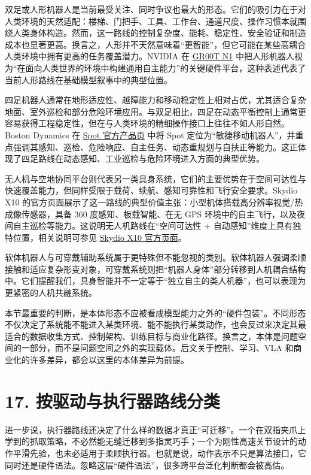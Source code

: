 双足或人形机器人是当前最受关注、同时争议也最大的形态。它们的吸引力在于对人类环境的天然适配：楼梯、门把手、工具、工作台、通道尺度、操作习惯本就围绕人类身体构造。然而，这一路线的控制复杂度、能耗、稳定性、安全验证和制造成本也显著更高。换言之，人形并不天然意味着“更智能”，但它可能在某些高耦合人类环境中拥有更高的任务覆盖潜力。NVIDIA 在 \href{https://arxiv.org/abs/2503.14734}{GR00T N1} 中把人形机器人视为“在面向人类世界的环境中构建通用自主能力”的关键硬件平台，这种表述代表了当前人形路线在基础模型叙事中的典型位置。

四足机器人通常在地形适应性、越障能力和移动稳定性上相对占优，尤其适合复杂地面、室外巡检和部分危险环境应用。与双足相比，四足在动态平衡控制上通常更容易获得工程稳定性，但在与人类环境的精细操作接口上往往不如人形自然。Boston Dynamics 在 \href{https://bostondynamics.com/products/spot/}{Spot 官方产品页} 中将 Spot 定位为“敏捷移动机器人”，并重点强调其感知、巡检、危险响应、自主任务、动态重规划与自扶正等能力。这正体现了四足路线在动态感知、工业巡检与危险环境进入方面的典型优势。

无人机与空地协同平台则代表另一类具身系统，它们的主要优势在于空间可达性与快速覆盖能力，但同样受限于载荷、续航、感知可靠性和飞行安全要求。Skydio X10 的官方页面展示了这一路线的典型价值主张：小型机体搭载高分辨率视觉/热成像传感器，具备 360 度感知、板载智能、在无 GPS 环境中的自主飞行，以及夜间自主巡检等能力。这说明无人机路线在“空间可达性 + 自动感知”维度上具有独特位置，相关说明可参见 \href{https://www.skydio.com/x10/}{Skydio X10 官方页面}。

软体机器人与可穿戴辅助系统属于更特殊但不能忽视的类别。软体机器人强调柔顺接触和适应复杂形变对象，可穿戴系统则把“机器人身体”部分转移到人机耦合结构中。它们提醒我们，具身智能并不一定等于“独立自主的类人机器”，也可以表现为更紧密的人机共融系统。

本节最重要的判断，是本体形态不应被看成模型能力之外的“硬件包装”。不同形态不仅决定了系统能不能进入某类环境、能不能执行某类动作，也会反过来决定其最适合的数据收集方式、控制架构、训练目标与商业化路径。换言之，本体是问题空间的一部分，而不是问题空间之外的实现载体。后文关于控制、学习、VLA 和商业化的许多差异，都会以这里的本体差异为前提。

\section*{17. 按驱动与执行器路线分类}

进一步说，执行器路线还决定了什么样的数据才真正“可迁移”。一个在双指夹爪上学到的抓取策略，不必然能无缝迁移到多指灵巧手；一个为刚性高速关节设计的动作平滑先验，也未必适用于柔顺执行器。也就是说，动作表示不只是算法接口，它同时还是硬件语法。忽略这层“硬件语法”，很多跨平台泛化判断都会被高估。

